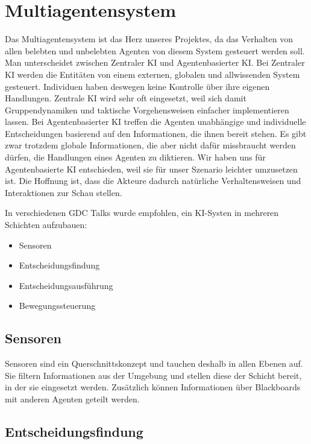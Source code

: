 \section{Multiagentensystem}

Das Multiagentensystem ist das Herz unseres Projektes, da das Verhalten von allen belebten und unbelebten Agenten von diesem System gesteuert werden soll. Man unterscheidet zwischen Zentraler KI und Agentenbasierter KI. Bei Zentraler KI werden die Entitäten von einem externen, globalen und allwissenden System gesteuert. Individuen haben deswegen keine Kontrolle über ihre eigenen Handlungen. Zentrale KI wird sehr oft eingesetzt, weil sich damit Gruppendynamiken und taktische Vorgehensweisen einfacher implementieren lassen. Bei Agentenbasierter KI treffen die Agenten unabhängige und individuelle Entscheidungen basierend auf den Informationen, die ihnen bereit stehen. Es gibt zwar trotzdem globale Informationen, die aber nicht dafür missbraucht werden dürfen, die Handlungen eines Agenten zu diktieren. Wir haben uns für Agentenbasierte KI entschieden, weil sie für unser Szenario leichter umzusetzen ist. Die Hoffnung ist, dass die Akteure dadurch natürliche Verhaltensweisen und Interaktionen zur Schau stellen.

In verschiedenen GDC \cite{YouTube_2019}\cite{YouTube_2022}\cite{YouTube_2023} Talks wurde empfohlen, ein KI-Systen in mehreren Schichten aufzubauen:

\begin{itemize}
\item Sensoren
\item Entscheidungsfindung
\item Entscheidungsausführung
\item Bewegungssteuerung
\end{itemize}

\subsection{Sensoren}

Sensoren sind ein Querschnittskonzept und tauchen deshalb in allen Ebenen auf. Sie filtern Informationen aus der Umgebung und stellen diese der Schicht bereit, in der sie eingesetzt werden. Zusätzlich können Informationen über Blackboards mit anderen Agenten geteilt werden.

\subsection{Entscheidungsfindung}

